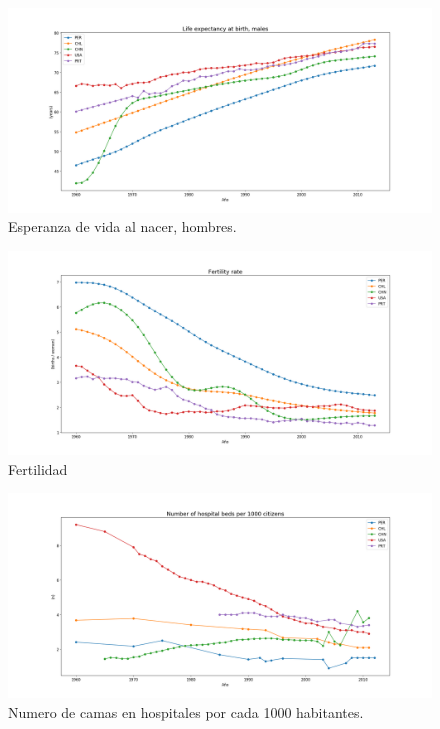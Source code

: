 \documentclass{article}
\begin{document}
\begin{figure}
	\centering
	\includegraphics[scale=0.38]{images/figure_1-1.png}
	\caption{Esperanza de vida al nacer, hombres.}
	\label{fig:3}
\end{figure}

\begin{figure}
	\centering
	\includegraphics[scale=0.38]{images/figure_1-2.png}
	\caption{Fertilidad}
	\label{fig:4}
\end{figure}

\begin{figure}
	\centering
	\includegraphics[scale=0.38]{images/figure_1-3.png}
	\caption{Numero de camas en hospitales por cada 1000 habitantes.}
	\label{fig:5}
\end{figure}
\end{document}
